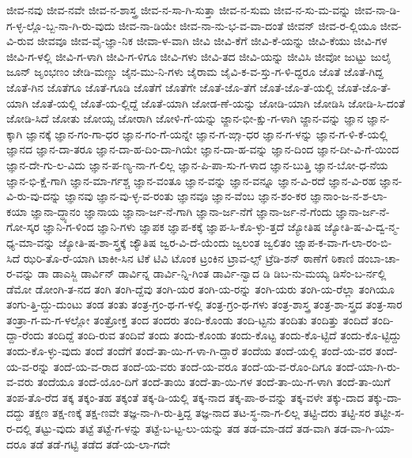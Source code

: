 {ಜೀವ-ನವು
ಜೀವ-ನವೇ
ಜೀವ-ನ-ಶಾಸ್ತ್ರ
ಜೀವ-ನ-ಸಾ-ಗಿ-ಸುತ್ತಾ
ಜೀವ-ನ-ಸುಮ
ಜೀವ-ನ-ಸು-ಮ-ವನ್ನು
ಜೀವ-ನಾ-ಡಿ-ಗ-ಳ್ಳ-ಲ್ಲೊ-ಬ್ಬ-ನಾ-ಗಿ-ರು-ವುದು
ಜೀವ-ನಾ-ಡಿಯೇ
ಜೀವ-ನಾ-ನು-ಭ-ವ-ವಾ-ದಂತೆ
ಜೀವನ್
ಜೀವ-ರ-ಲ್ಲಿಯೂ
ಜೀವ-ವಿ-ರುವ
ಜೀವವೂ
ಜೀವ-ವೈ-ಜ್ಞಾ-ನಿಕ
ಜೀವಾ-ಳ-ವಾಗಿ
ಜೀವಿ
ಜೀವಿ-ಕೆಗೆ
ಜೀವಿ-ಕೆ-ಯನ್ನು
ಜೀವಿ-ಕೆಯು
ಜೀವಿ-ಗಳ
ಜೀವಿ-ಗ-ಳಲ್ಲಿ
ಜೀವಿ-ಗ-ಳಾಗಿ
ಜೀವಿ-ಗ-ಳಿಗೂ
ಜೀವಿ-ಗಳು
ಜೀವಿ-ತದ
ಜೀವಿ-ಯನ್ನು
ಜೀವಿಸಿ
ಜೀವೋ
ಜುಟ್ಟು
ಜುಲೈ
ಜೂನ್
ಜೃಂಭಣಂ
ಜೇಡಿ-ಮಣ್ಣು
ಜೈನ-ಮು-ನಿ-ಗಳು
ಜೈರಾಮ
ಜೈವಿ-ಕ-ವ-ಸ್ತು-ಗ-ಳಿ-ದ್ದರೂ
ಜೊತೆ
ಜೊತೆ-ಗಿದ್ದ
ಜೊತೆ-ಗಿನ
ಜೊತೆಗೂ
ಜೊತೆ-ಗೂಡಿ
ಜೊತೆಗೆ
ಜೊತೆಗೇ
ಜೊತೆ-ಜೊ-ತೆಗೆ
ಜೊತೆ-ಜೊ-ತೆ-ಯಲ್ಲಿ
ಜೊತೆ-ಜೊ-ತೆ-ಯಾಗಿ
ಜೊತೆ-ಯಲ್ಲಿ
ಜೊತೆ-ಯ-ಲ್ಲಿದ್ದೆ
ಜೊತೆ-ಯಾಗಿ
ಜೋಡ-ಣೆ-ಯನ್ನು
ಜೋಡಿ-ಯಾಗಿ
ಜೋಡಿಸಿ
ಜೋಡಿ-ಸಿ-ದಂತೆ
ಜೋಡಿ-ಸಿದೆ
ಜೋತು
ಜೋಯ್ಸ
ಜೋರಾಗಿ
ಜೋಳಿ-ಗೆ-ಯನ್ನು
ಜ್ಙಾನ-ಭೀ-ಕ್ಷು-ಗ-ಳಾಗಿ
ಜ್ಙಾನ-ವನ್ನು
ಜ್ಞಾನ
ಜ್ಞಾನ-ಕ್ಕಾಗಿ
ಜ್ಞಾನಕ್ಕೆ
ಜ್ಞಾನ-ಗಂ-ಗಾ-ಧರ
ಜ್ಞಾನ-ಗಂ-ಗೆ-ಯನ್ನೇ
ಜ್ಞಾನ-ಗ-ಙ್ಗಾ-ಧರ
ಜ್ಞಾನ-ಗ-ಳನ್ನು
ಜ್ಞಾನ-ಗ-ಳಿ-ಕೆ-ಯಲ್ಲಿ
ಜ್ಞಾನದ
ಜ್ಞಾನ-ದಾ-ತರೂ
ಜ್ಞಾನ-ದಾ-ಹ-ದಿಂ-ದಾ-ಗಿಯೇ
ಜ್ಞಾನ-ದಾ-ಹ-ವನ್ನು
ಜ್ಞಾನ-ದಿಂದ
ಜ್ಞಾನ-ದೀ-ವಿ-ಗೆ-ಯಿಂದ
ಜ್ಞಾನ-ದೇ-ಗು-ಲ-ವಿದು
ಜ್ಞಾನ-ಪ-ಣ್ಯ-ನಾ-ಗ-ಲಿಲ್ಲ
ಜ್ಞಾನ-ಪಿ-ಪಾ-ಸು-ಗ-ಳಾದ
ಜ್ಞಾನ-ಬುತ್ತಿ
ಜ್ಞಾನ-ಬೋ-ಧ-ನೆಯ
ಜ್ಞಾನ-ಭಿ-ಕ್ಷೆ-ಗಾಗಿ
ಜ್ಞಾನ-ಮಾ-ರ್ಗಶ್ಚ
ಜ್ಞಾನ-ವಂತೂ
ಜ್ಞಾನ-ವನ್ನು
ಜ್ಞಾನ-ವನ್ನೂ
ಜ್ಞಾನ-ವಿ-ರದೆ
ಜ್ಞಾನ-ವಿ-ರಹ
ಜ್ಞಾನ-ವಿ-ರು-ವು-ದನ್ನು
ಜ್ಞಾನವು
ಜ್ಞಾನ-ವು-ಳ್ಳ-ವ-ರಂತು
ಜ್ಞಾನವೂ
ಜ್ಞಾನ-ವೆಂಬ
ಜ್ಞಾನ-ಶಂ-ಕರ
ಜ್ಞಾನಾಂ-ಜ-ನ-ಶ-ಲಾ-ಕಯಾ
ಜ್ಞಾನಾ-ದ್ಧ್ಯಾನಂ
ಜ್ಞಾನಾಯ
ಜ್ಞಾನಾ-ರ್ಜ-ನೆ-ಗಾಗಿ
ಜ್ಞಾನಾ-ರ್ಜ-ನೆಗೆ
ಜ್ಞಾನಾ-ರ್ಜ-ನೆ-ಗೆಂದು
ಜ್ಞಾನಾ-ರ್ಜ-ನೆ-ಗೋ-ಸ್ಕರ
ಜ್ಞಾನಿ-ಗ-ಳಿಂದ
ಜ್ಞಾನಿ-ಗಳು
ಜ್ಞಾಪಕ
ಜ್ಞಾಪ-ಕಕ್ಕೆ
ಜ್ಞಾಪ-ಸಿ-ಕೊ-ಳ್ಳು-ತ್ತದೆ
ಜ್ಯೋತಿಷ
ಜ್ಯೋತಿ-ಷ-ವಿ-ದ್ವ-ನ್ಮ-ಧ್ಯ-ಮಾ-ವನ್ನು
ಜ್ಯೋತಿ-ಷ-ಶಾ-ಸ್ತ್ರಕ್ಕೆ
ಜ್ಯೌತಿಷ
ಜ್ವರ-ವಿ-ದೆ-ಯೆಂದು
ಜ್ವಲಂತ
ಜ್ವಲಿತಂ
ಜ್ಷಾಪ-ಕ-ವಾ-ಗ-ಲಾ-ರಂ-ಬಿ-ಸಿದೆ
ಝರಿ-ತೊ-ರೆ-ಯಾಗಿ
ಟಾಕೀ-ಸಿನ
ಟಿಕೆ
ಟಿವಿ
ಟೊಂಕ
ಟ್ರಂಕಿನ
ಟ್ರಾವ-ಲ್ಸ್
ಟ್ರೆಡಿ-ಶನ್
ಠಾಣೆಗೆ
ಠಿಕಾಣಿ
ಡಂಬಾ-ಚಾ-ರ-ವನ್ನು
ಡಾ
ಡಾಎಸ್ಜಿ
ಡಾರ್ವಿನ್
ಡಾರ್ವಿನ್ನ
ಡಾರ್ವಿ-ನ್ನಿ-ಗಿಂತ
ಡಾರ್ವಿ-ನ್ವಾದ
ಡಿ
ಡಿಬ-ನು-ಮಯ್ಯ
ಡಿಸೆಂ-ಬ-ರ್ನಲ್ಲಿ
ಡೆಮೋ
ಡೋಂಗಿ-ತ-ನದ
ತಂಗಿ
ತಂಗಿ-ದ್ದೆವು
ತಂಗಿ-ಯರ
ತಂಗಿ-ಯ-ರನ್ನು
ತಂಗಿ-ಯರು
ತಂಗಿ-ಯ-ರೆಲ್ಲಾ
ತಂಗಿಯೂ
ತಂಗು-ತ್ತಿ-ದ್ದು-ದುಂಟು
ತಂಡ
ತಂತು
ತಂತ್ರ-ಗ್ರಂ-ಥ-ಗ-ಳಲ್ಲಿ
ತಂತ್ರ-ಗ್ರಂ-ಥ-ಗಳು
ತಂತ್ರ-ಶಾಸ್ತ್ರ
ತಂತ್ರ-ಶಾ-ಸ್ತ್ರದ
ತಂತ್ರ-ಸಾರ
ತಂತ್ರಾ-ಗ-ಮ-ಗ-ಳಲ್ಲೋ
ತಂತ್ರೋಕ್ತ
ತಂದ
ತಂದರು
ತಂದಿ-ಕೊಂಡು
ತಂದಿ-ಟ್ಟನು
ತಂದಿತು
ತಂದಿತ್ತು
ತಂದಿದೆ
ತಂದಿ-ದ್ದಾ-ರೆಂದು
ತಂದಿದ್ದೆ
ತಂದಿ-ರುವ
ತಂದಿವೆ
ತಂದು
ತಂದು-ಕೊಂಡು
ತಂದು-ಕೊಟ್ಟ
ತಂದು-ಕೊ-ಟ್ಟಿದೆ
ತಂದು-ಕೊ-ಟ್ಟಿದ್ದು
ತಂದು-ಕೊ-ಳ್ಳು-ವುದು
ತಂದೆ
ತಂದೆಗೆ
ತಂದೆ-ತಾ-ಯಿ-ಗ-ಳಾ-ಗಿ-ದ್ದಾರೆ
ತಂದೆಯ
ತಂದೆ-ಯಲ್ಲಿ
ತಂದೆ-ಯ-ವರ
ತಂದೆ-ಯ-ವ-ರನ್ನು
ತಂದೆ-ಯ-ವ-ರಾದ
ತಂದೆ-ಯ-ವರು
ತಂದೆ-ಯ-ವರೂ
ತಂದೆ-ಯ-ವ-ರೊಂ-ದಿಗೂ
ತಂದೆ-ಯಾ-ಗಿ-ರು-ವ-ವರು
ತಂದೆಯೂ
ತಂದೆ-ಯೊಂ-ದಿಗೆ
ತಂದೆ-ತಾಯಿ
ತಂದೆ-ತಾ-ಯಿ-ಗಳ
ತಂದೆ-ತಾ-ಯಿ-ಗ-ಳಾಗಿ
ತಂದೆ-ತಾ-ಯಿಗೆ
ತಂಪ-ತೊ-ರೆದ
ತಕ್ಕ
ತಕ್ಕಂ-ತಹ
ತಕ್ಕಂತೆ
ತಕ್ಕ-ಡಿ-ಯಲ್ಲಿ
ತಕ್ಕ-ನಾದ
ತಕ್ಕ-ಪಾ-ಠ-ವನ್ನು
ತಕ್ಕ-ವಳೇ
ತಕ್ಕು-ದಾದ
ತಕ್ಕು-ದಾ-ದದ್ದು
ತಕ್ಷಣ
ತಕ್ಷ-ಣಕ್ಕೆ
ತಕ್ಷ-ಣವೇ
ತಜ್ಞ-ನಾ-ಗಿ-ರು-ತ್ತಿದ್ದ
ತಜ್ಞ-ನಾದ
ತಟ-ಸ್ಥ-ನಾ-ಗ-ಲಿಲ್ಲ
ತಟ್ಟಿ-ದರು
ತಟ್ಟಿ-ಸರ
ತಟ್ಟೀ-ಸ-ರ-ದಲ್ಲಿ
ತಟ್ಟು-ವುದು
ತಟ್ಟೆ
ತಟ್ಟೆ-ಗ-ಳನ್ನು
ತಟ್ಟೆ-ಬ-ಟ್ಟ-ಲು-ಯನ್ನು
ತಡ
ತಡ-ಮಾ-ಡದೆ
ತಡ-ವಾಗಿ
ತಡ-ವಾ-ಗಿ-ಯಾ-ದರೂ
ತಡೆ
ತಡೆ-ಗಟ್ಟಿ
ತಡೆದ
ತಡೆ-ಯ-ಲಾ-ಗದೇ
}
